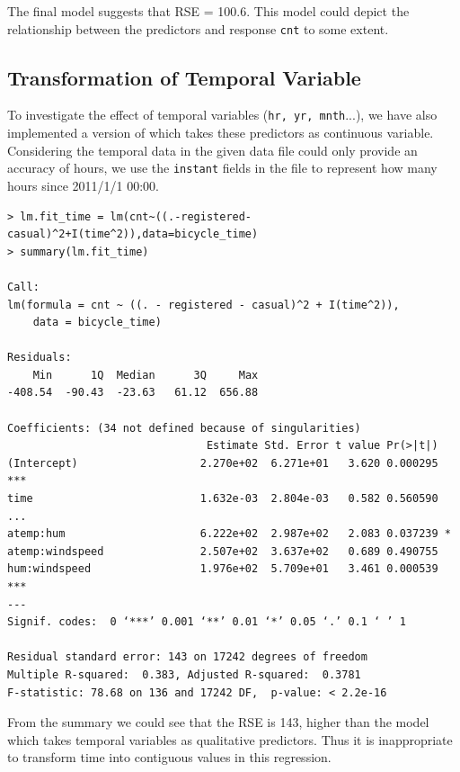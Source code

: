 The final model suggests that RSE = 100.6. This model could depict the relationship between the predictors and response \texttt{cnt} to some extent.

\subsection{Transformation of Temporal Variable}
To investigate the effect of temporal variables (\texttt{hr, yr, mnth}...), we have also implemented a version of {\mlr} which takes these predictors as continuous variable. Considering the temporal data in the given data file could only provide an accuracy of hours, we use the \texttt{instant} fields in the file to represent how many hours since 2011/1/1 00:00.
\begin{lstlisting}[style=rlanguage]
> lm.fit_time = lm(cnt~((.-registered-casual)^2+I(time^2)),data=bicycle_time)
> summary(lm.fit_time)

Call:
lm(formula = cnt ~ ((. - registered - casual)^2 + I(time^2)),
    data = bicycle_time)

Residuals:
    Min      1Q  Median      3Q     Max
-408.54  -90.43  -23.63   61.12  656.88

Coefficients: (34 not defined because of singularities)
                               Estimate Std. Error t value Pr(>|t|)
(Intercept)                   2.270e+02  6.271e+01   3.620 0.000295 ***
time                          1.632e-03  2.804e-03   0.582 0.560590
...
atemp:hum                     6.222e+02  2.987e+02   2.083 0.037239 *
atemp:windspeed               2.507e+02  3.637e+02   0.689 0.490755
hum:windspeed                 1.976e+02  5.709e+01   3.461 0.000539 ***
---
Signif. codes:  0 ‘***’ 0.001 ‘**’ 0.01 ‘*’ 0.05 ‘.’ 0.1 ‘ ’ 1

Residual standard error: 143 on 17242 degrees of freedom
Multiple R-squared:  0.383,	Adjusted R-squared:  0.3781
F-statistic: 78.68 on 136 and 17242 DF,  p-value: < 2.2e-16
\end{lstlisting}

From the summary we could see that the RSE is 143, higher than the model which takes temporal variables as qualitative predictors. Thus it is inappropriate to transform time into contiguous values in this regression.


